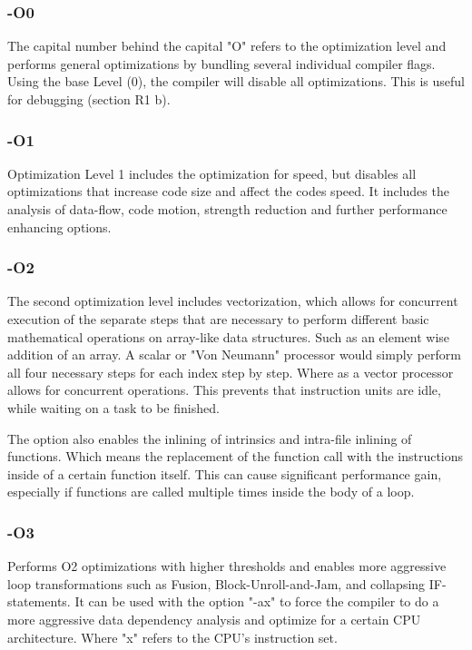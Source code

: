 \documentclass[a4paper, 11pt, oneside]{scrartcl}
\begin{document}
\subsubsection*{-O0}
The capital number behind the capital "O" refers to the optimization level and performs general optimizations by bundling several individual compiler flags. Using the base Level (0),  the compiler will disable all optimizations. This is useful for debugging (section R1 b).

\subsubsection*{-O1}
Optimization Level 1 includes the optimization for speed, but disables all optimizations that increase code size and affect the codes speed. It includes the analysis of data-flow, code motion, strength reduction and further performance enhancing options.

\subsubsection*{-O2}
The second optimization level includes vectorization, which allows for concurrent execution of the separate steps that are necessary to perform different basic mathematical operations on array-like data structures. Such as an element wise addition of an array. A scalar or "Von Neumann" processor would simply perform all four necessary steps for each index step by step. Where as a vector processor allows for concurrent operations. This prevents that instruction units are idle, while waiting on a task to be finished.

The option also enables the inlining of intrinsics and intra-file inlining of functions. Which means the replacement of the function call with the instructions inside of a certain function itself. This can cause significant performance gain, especially if functions are called multiple times inside the body of a loop.

\subsubsection*{-O3}
Performs O2 optimizations with higher thresholds and enables more aggressive loop transformations such as Fusion, Block-Unroll-and-Jam, and collapsing IF-statements. It can be used with the option "-ax" to force the compiler to do a more aggressive data dependency analysis and optimize for a certain CPU architecture. Where "x" refers to the CPU's instruction set.
\end{document}
